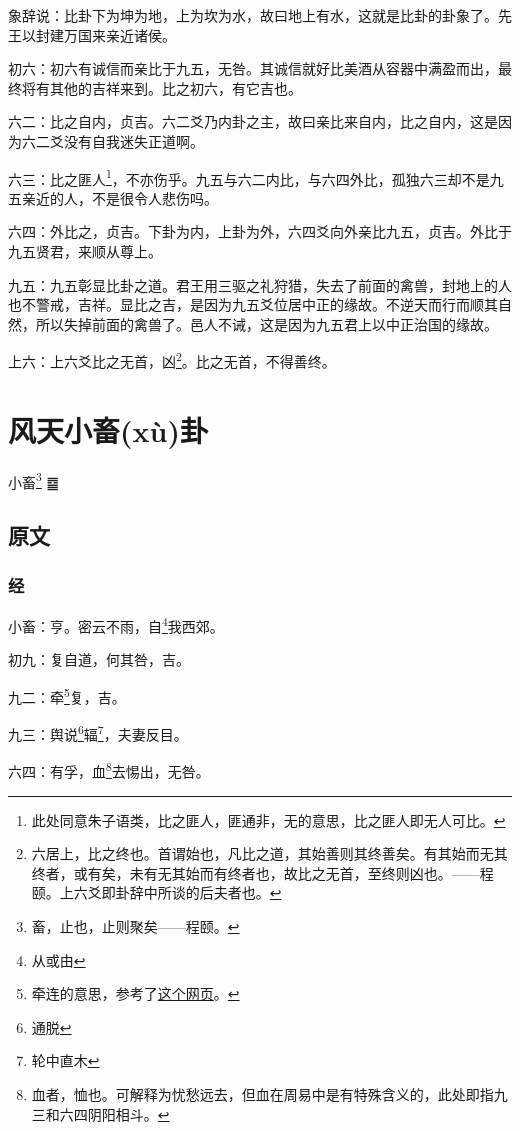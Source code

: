 \documentclass[12pt,oneside]{book}
\begin{document}
象辞说：比卦下为坤为地，上为坎为水，故曰地上有水，这就是比卦的卦象了。先王以封建万国来亲近诸侯。

初六：初六有诚信而亲比于九五，无咎。其诚信就好比美酒从容器中满盈而出，最终将有其他的吉祥来到。比之初六，有它吉也。

六二：比之自内，贞吉。六二爻乃内卦之主，故曰亲比来自内，比之自内，这是因为六二爻没有自我迷失正道啊。

六三：比之匪人\footnote{此处同意朱子语类，比之匪人，匪通非，无的意思，比之匪人即无人可比。}，不亦伤乎。九五与六二内比，与六四外比，孤独六三却不是九五亲近的人，不是很令人悲伤吗。

六四：外比之，贞吉。下卦为内，上卦为外，六四爻向外亲比九五，贞吉。外比于九五贤君，来顺从尊上。

九五：九五彰显比卦之道。君王用三驱之礼狩猎，失去了前面的禽兽，封地上的人也不警戒，吉祥。显比之吉，是因为九五爻位居中正的缘故。不逆天而行而顺其自然，所以失掉前面的禽兽了。邑人不诫，这是因为九五君上以中正治国的缘故。

上六：上六爻比之无首，凶\footnote{六居上，比之终也。首谓始也，凡比之道，其始善则其终善矣。有其始而无其终者，或有矣，未有无其始而有终者也，故比之无首，至终则凶也。——程颐。上六爻即卦辞中所谈的后夫者也。}。比之无首，不得善终。



\chapter{风天小畜(xù)卦}
小畜\footnote{畜，止也，止则聚矣——程颐。} {\Large ䷈}

\section{原文}

\subsection{经}
小畜：亨。密云不雨，自\footnote{从或由}我西郊。

初九：复自道，何其咎，吉。

九二：牵\footnote{牵连的意思，参考了\href{http://baike.yidao5.com/jingzhuan/xiaoxugua/6428.shtml}{这个网页}。}复，吉。

九三：舆说\footnote{通脱}辐\footnote{轮中直木}，夫妻反目。

六四：有孚，血\footnote{血者，恤也。可解释为忧愁远去，但血在周易中是有特殊含义的，此处即指九三和六四阴阳相斗。}去惕出，无咎。
\end{document}
